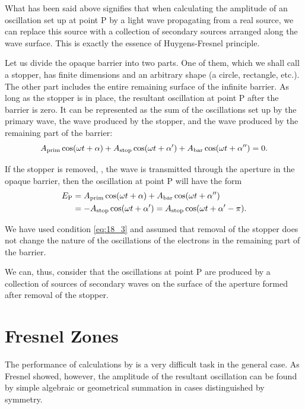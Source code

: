 What has been said above signifies that when calculating the amplitude of an oscillation set up at point P by a light wave propagating from a real source, we can replace this source with a collection of secondary sources arranged along the wave surface.
This is exactly the essence of Huygens-Fresnel principle.

Let us divide the opaque barrier into two parts.
One of them, which we shall call a stopper, has finite dimensions and an arbitrary shape (a circle, rectangle, etc.).
The other part includes the entire remaining surface of the infinite barrier.
As long as the stopper is in place, the resultant oscillation at point P after the barrier is zero.
It can be represented as the sum of the oscillations set up by the primary wave, the wave produced by the stopper, and the wave produced by
the remaining part of the barrier:
\begin{equation}\label{eq:18_3}
    A_{\text{prim}} \cos(\omega t+\alpha) + A_{\text{stop}} \cos(\omega t+\alpha') + A_{\text{bar}} \cos(\omega t+\alpha'') = 0.
\end{equation}

If the stopper is removed, \ie, the wave is transmitted through the aperture in the opaque barrier, then the oscillation at point P will have the form
\begin{align*}
    E_{\text{P}} &= A_{\text{prim}} \cos(\omega t+\alpha) + A_{\text{bar}} \cos(\omega t+\alpha'') \\
    &= - A_{\text{stop}} \cos(\omega t+\alpha') = A_{\text{stop}} \cos(\omega t+\alpha'-\pi).
\end{align*}

We have used condition \eqref{eq:18_3} and assumed that removal of the stopper does not change the nature of the oscillations of the electrons in the remaining part of the barrier.

We can, thus, consider that the oscillations at point P are produced by a collection of sources of secondary waves on the surface of the aperture formed after removal of the stopper.

\section{Fresnel Zones}\label{sec:18_3}

The performance of calculations by  is a very difficult task in the general case.
As Fresnel showed, however, the amplitude of the resultant oscillation can be found by simple algebraic or geometrical summation in cases distinguished by symmetry.

